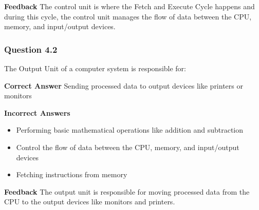 \textbf{Feedback}
The control unit is where the Fetch and Execute Cycle happens and during this cycle, the control unit manages the flow of data between the CPU, memory, and input/output devices.

\subsubsection{Question 4.2}

The Output Unit of a computer system is responsible for:

\textbf{Correct Answer}
Sending processed data to output devices like printers or monitors

\textbf{Incorrect Answers}
\begin{itemize}
    \item Performing basic mathematical operations like addition and subtraction
    \item Control the flow of data between the CPU, memory, and input/output devices
    \item Fetching instructions from memory
\end{itemize}

\textbf{Feedback}
The output unit is responsible for moving processed data from the CPU to the output devices like monitors and printers.


